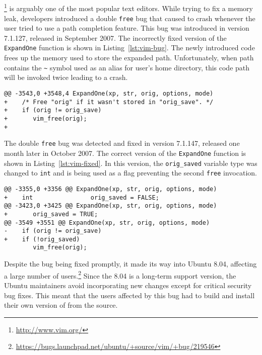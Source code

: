 \subsection{\vim}

\vim\footnote{\url{http://www.vim.org/}} is arguably one of the most popular
text editors. While trying to fix a memory leak, \vim developers introduced a
double \lstinline`free` bug that caused \vim to crash whenever the user tried to
use a path completion feature. This bug was introduced in version 7.1.127,
released in September 2007. The incorrectly fixed version of the
\lstinline`ExpandOne` function is shown in Listing~\ref{lst:vim-bug}. The newly
introduced code frees up the memory used to store the expanded path.
Unfortunately, when path contains the \lstinline`~` symbol used as an alias for
user's home directory, this code path will be invoked twice leading to a crash.

\begin{lstlisting}[alsolanguage=diff,numbers=none,label=lst:vim-bug,caption={First (incorrect) fix of \lstinline`ExpandOne` function in \vim.}]
@@ -3543,0 +3548,4 ExpandOne(xp, str, orig, options, mode)
+    /* Free "orig" if it wasn't stored in "orig_save". */
+    if (orig != orig_save)
+       vim_free(orig);
+
\end{lstlisting}

The double \lstinline`free` bug was detected and fixed in version 7.1.147, released
one month later in October 2007. The correct version of the \lstinline`ExpandOne`
function is shown in Listing~\ref{lst:vim-fixed}. In this version, the
\lstinline`orig_saved` variable type was changed to \lstinline`int` and is
being used as a flag preventing the second \lstinline`free` invocation.

\begin{lstlisting}[alsolanguage=diff,numbers=none,label=lst:vim-fixed,caption={Second (correct) fix \lstinline`ExpandOne` function in \vim.}]
@@ -3355,0 +3356 @@ ExpandOne(xp, str, orig, options, mode)
+    int                orig_saved = FALSE;
@@ -3423,0 +3425 @@ ExpandOne(xp, str, orig, options, mode)
+       orig_saved = TRUE;
@@ -3549 +3551 @@ ExpandOne(xp, str, orig, options, mode)
-    if (orig != orig_save)
+    if (!orig_saved)
        vim_free(orig);
\end{lstlisting}

Despite the bug being fixed promptly, it made its way into Ubuntu 8.04,
affecting a large number of
users.\footnote{\url{https://bugs.launchpad.net/ubuntu/+source/vim/+bug/219546}}
Since the 8.04 is a long-term support version, the Ubuntu maintainers avoid
incorporating new changes except for critical security bug fixes. This meant
that the \vim users affected by this bug had to build and install their own
version of \vim from the source.

